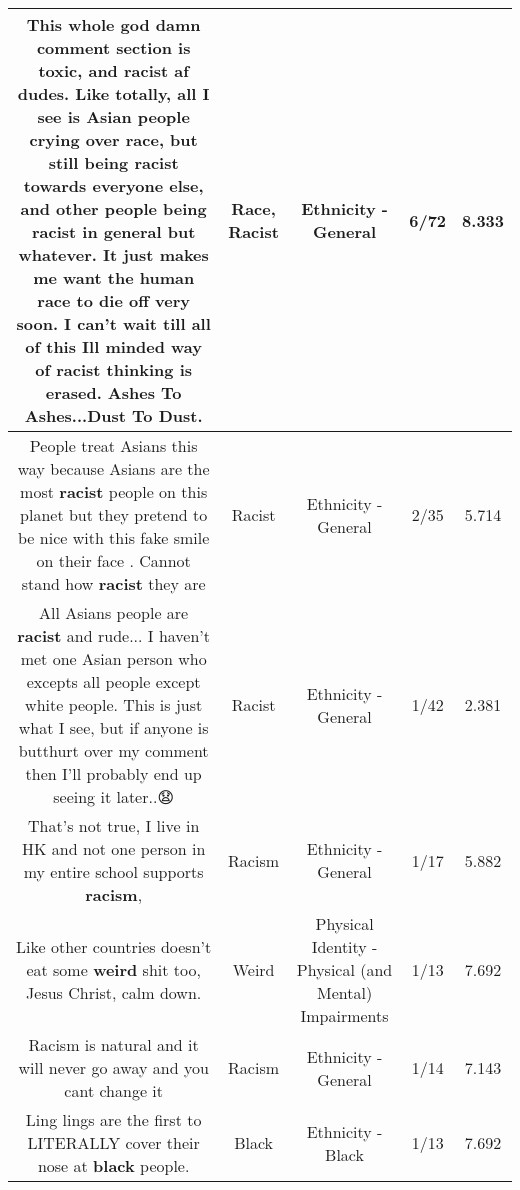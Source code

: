 \documentclass[11pt]{article}
\newlength\mylength
\begin{document}
\begin{center}
\begin{longtable}{|C{.65\mylength}|C{.30\mylength}|C{.12\mylength}|C{.12\mylength}|C{.12\mylength}|}
  \small This whole god damn comment section is toxic, and \textbf{racist} af dudes. Like totally, all I see is Asian people crying over \textbf{race}, but still being \textbf{racist} towards everyone else, and other people being \textbf{racist} in general but whatever. It just makes me want the human \textbf{race} to die off very soon. I can't wait till all of this Ill minded way of \textbf{racist} thinking is erased. Ashes To Ashes...Dust To Dust.\normalsize   & Race, Racist & Ethnicity - General & 6/72 & 8.333 \\  \hline
  \small People treat Asians this way because Asians are the most \textbf{racist} people on this planet but they pretend to be nice with this fake smile on their face . Cannot stand how \textbf{racist} they are\normalsize   & Racist & Ethnicity - General & 2/35 & 5.714 \\  \hline
  \small All Asians people are \textbf{racist} and rude... I haven't met one Asian person who excepts all people except white people. This is just what I see, but if anyone is butthurt over my comment then I'll probably end up seeing it later..😧\normalsize   & Racist & Ethnicity - General & 1/42 & 2.381 \\  \hline
  \small That's not true, I live in HK and not one person in my entire school supports \textbf{racism},\normalsize   & Racism & Ethnicity - General & 1/17 & 5.882 \\  \hline
  \small Like other countries doesn't eat some \textbf{weird} shit too, Jesus Christ, calm down.\normalsize   & Weird & Physical Identity - Physical (and Mental) Impairments & 1/13 & 7.692 \\  \hline
  \small Racism is natural and it will never go away and you cant change it\normalsize   & Racism & Ethnicity - General & 1/14 & 7.143 \\  \hline
  \small Ling lings are the first to LITERALLY cover their nose at \textbf{black} people.\normalsize   & Black & Ethnicity - Black & 1/13 & 7.692 \\  \hline

\end{longtable}
\end{center}
\end{document}
